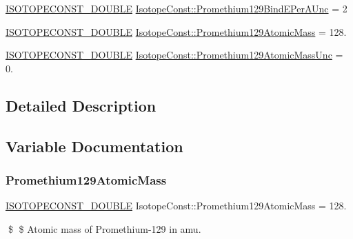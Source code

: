 \begin{DoxyCompactItemize}
\mbox{\hyperlink{group___isotope_const-_macros_ga8f45a7272ce02c0b4c65c44636ed719a}{I\+S\+O\+T\+O\+P\+E\+C\+O\+N\+S\+T\+\_\+\+D\+O\+U\+B\+LE}} \mbox{\hyperlink{group___isotope_const-_promethium-_pm129_ga8b84e95c1382df18eb71d8507811c325}{Isotope\+Const\+::\+Promethium129\+Bind\+E\+Per\+A\+Unc}} = 2
\item 
\mbox{\hyperlink{group___isotope_const-_macros_ga8f45a7272ce02c0b4c65c44636ed719a}{I\+S\+O\+T\+O\+P\+E\+C\+O\+N\+S\+T\+\_\+\+D\+O\+U\+B\+LE}} \mbox{\hyperlink{group___isotope_const-_promethium-_pm129_gac73c62bbcd0fffb446ccd066ff4ad4e5}{Isotope\+Const\+::\+Promethium129\+Atomic\+Mass}} = 128.
\item 
\mbox{\hyperlink{group___isotope_const-_macros_ga8f45a7272ce02c0b4c65c44636ed719a}{I\+S\+O\+T\+O\+P\+E\+C\+O\+N\+S\+T\+\_\+\+D\+O\+U\+B\+LE}} \mbox{\hyperlink{group___isotope_const-_promethium-_pm129_gab82682e6f1df4f574b80e8e4f6f11fe3}{Isotope\+Const\+::\+Promethium129\+Atomic\+Mass\+Unc}} = 0.
\end{DoxyCompactItemize}


\subsection{Detailed Description}


\subsection{Variable Documentation}
\mbox{\label{group___isotope_const-_promethium-_pm129_gac73c62bbcd0fffb446ccd066ff4ad4e5}} 
\subsubsection{\texorpdfstring{Promethium129\+Atomic\+Mass}{Promethium129AtomicMass}}
{\footnotesize\ttfamily \mbox{\hyperlink{group___isotope_const-_macros_ga8f45a7272ce02c0b4c65c44636ed719a}{I\+S\+O\+T\+O\+P\+E\+C\+O\+N\+S\+T\+\_\+\+D\+O\+U\+B\+LE}} Isotope\+Const\+::\+Promethium129\+Atomic\+Mass = 128.}

\$ \$ Atomic mass of Promethium-\/129 in amu. \mbox{\label{group___isotope_const-_promethium-_pm129_gab82682e6f1df4f574b80e8e4f6f11fe3}} 
